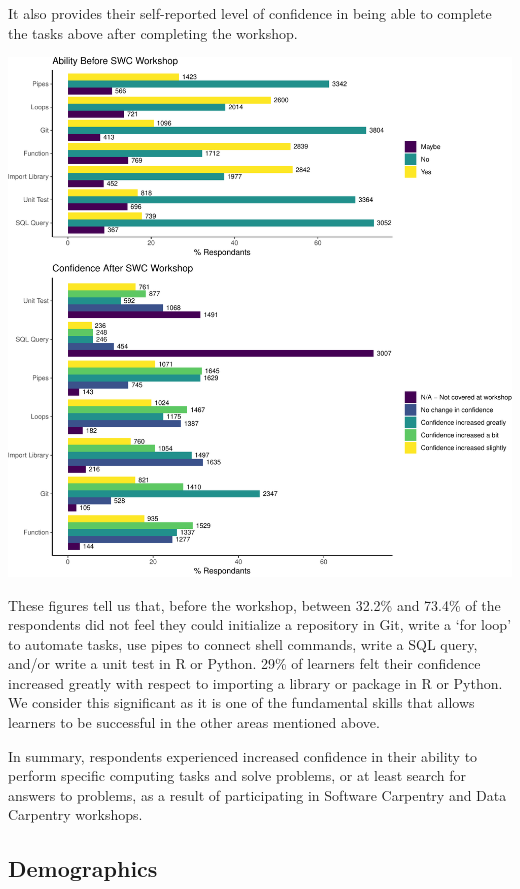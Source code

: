 \documentclass[]{article}
\makeatletter
\def\maxwidth{\ifdim\Gin@nat@width>\linewidth\linewidth\else\Gin@nat@width\fi}
\makeatother
\begin{document}
It also provides their self-reported level of confidence in being able
to complete the tasks above after completing the workshop.

\includegraphics[width=\maxwidth]{../figures/swc-ability-confidence-1}

These figures tell us that, before the workshop, between 32.2\% and
73.4\% of the respondents did not feel they could initialize a
repository in Git, write a `for loop' to automate tasks, use pipes to
connect shell commands, write a SQL query, and/or write a unit test in R
or Python. 29\% of learners felt their confidence increased greatly with
respect to importing a library or package in R or Python. We consider
this significant as it is one of the fundamental skills that allows
learners to be successful in the other areas mentioned above.

In summary, respondents experienced increased confidence in their
ability to perform specific computing tasks and solve problems, or at
least search for answers to problems, as a result of participating in
Software Carpentry and Data Carpentry workshops.

\subsection{Demographics}\label{demographics}
\end{document}
